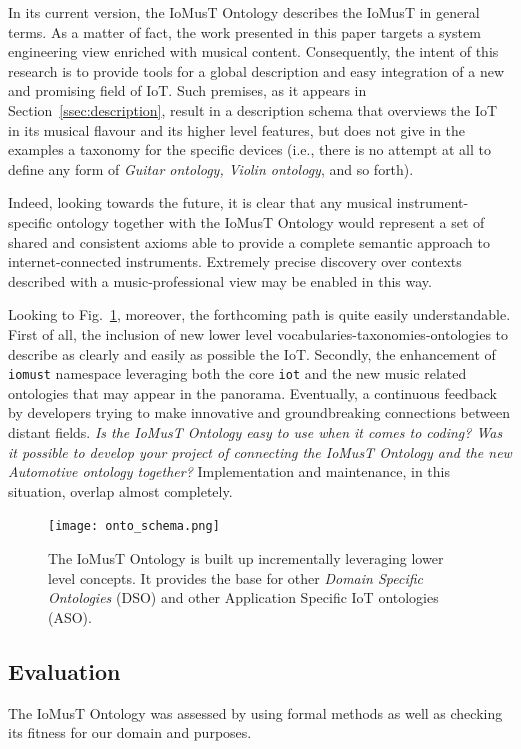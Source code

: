 In its current version, the IoMusT Ontology describes the IoMusT in general terms. As a matter of fact, the work presented in this paper targets a system engineering view enriched with musical content. Consequently, the intent of this research is to provide tools for a global description and easy integration of a new and promising field of IoT. Such premises, as it appears in Section~\ref{ssec:description}, result in a description schema that overviews the IoT in its musical flavour and its higher level features, but does not give in the examples a taxonomy for the specific devices (i.e., there is no attempt at all to define any form of \textit{Guitar ontology, Violin ontology}, and so forth).

Indeed, looking towards the future, it is clear that any musical instrument-specific ontology together with the IoMusT Ontology would represent a set of shared and consistent axioms able to provide a complete semantic approach to internet-connected instruments. Extremely precise discovery over contexts described with a music-professional view may be enabled in this way.

Looking to Fig.~\ref{fig:fig1}, moreover, the forthcoming path is quite easily understandable. First of all, the inclusion of new lower level vocabularies-taxonomies-ontologies to describe as clearly and easily as possible the IoT. Secondly, the enhancement of \texttt{iomust} namespace leveraging both the core \texttt{iot} and the new music related ontologies that may appear in the panorama. Eventually, a continuous feedback by developers trying to make innovative and groundbreaking connections between distant fields. \textit{Is the IoMusT Ontology easy to use when it comes to coding? Was it possible to develop your project of connecting the IoMusT Ontology and the new Automotive ontology together?} Implementation and maintenance, in this situation, overlap almost completely.

\begin{figure}[h!]
\centering
\texttt{[image: onto\_schema.png]}
\caption{The IoMusT Ontology is built up incrementally leveraging lower level concepts. It provides the base for other \textit{Domain Specific Ontologies} (DSO) and other Application Specific IoT ontologies (ASO).}
\label{fig:fig1}
\end{figure}

\subsection{Evaluation}
\label{ssec:iomust_evaluation}
The IoMusT Ontology was assessed by using formal methods as well as checking its fitness for our domain and purposes.


